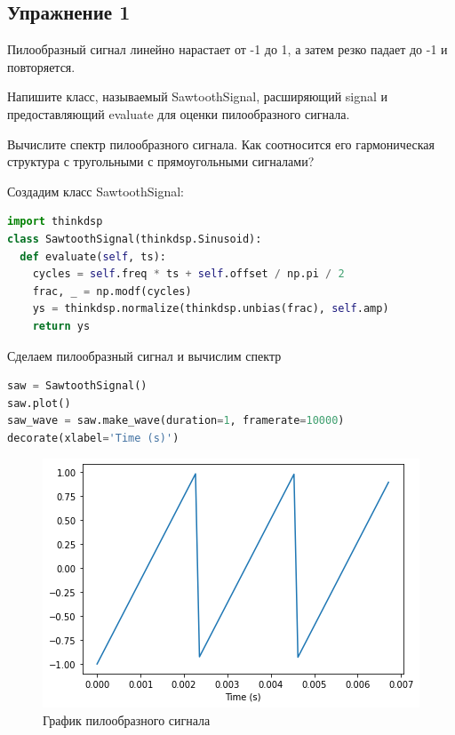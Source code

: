 \subsection{Упражнение 1}

Пилообразный сигнал линейно нарастает от -1 до 1, а затем резко падает до -1 и повторяется.

\noindent Напишите класс, называемый SawtoothSignal, расширяющий signal и предоставляющий evaluate для оценки пилообразного сигнала.

\noindent Вычислите спектр пилообразного сигнала. Как соотносится его гармоническая структура с тругольными с прямоугольными сигналами?

Создадим класс SawtoothSignal:

\begin{lstlisting}[language=Python]
import thinkdsp
class SawtoothSignal(thinkdsp.Sinusoid):
  def evaluate(self, ts):
    cycles = self.freq * ts + self.offset / np.pi / 2
    frac, _ = np.modf(cycles)
    ys = thinkdsp.normalize(thinkdsp.unbias(frac), self.amp)
    return ys
\end{lstlisting}

Сделаем пилообразный сигнал и вычислим спектр

\begin{lstlisting}[language=Python]
saw = SawtoothSignal()
saw.plot()
saw_wave = saw.make_wave(duration=1, framerate=10000)
decorate(xlabel='Time (s)')
\end{lstlisting}

\begin{figure}[H]
	\begin{center}
		\includegraphics[scale=1]{fig/lab02/lab02_01.png}
		\caption{График пилообразного сигнала}
	\end{center}
\end{figure}

